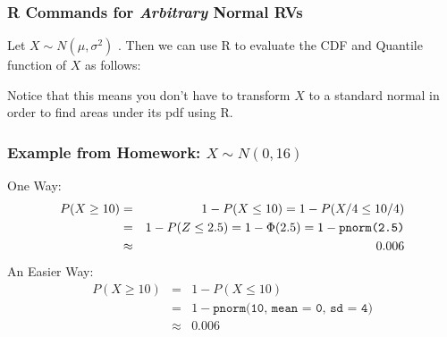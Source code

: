 \documentclass[handout]{beamer}
\begin{document}

\begin{frame}
  \frametitle{R Commands for \emph{Arbitrary} Normal RVs}
Let $X \sim N(\mu, \sigma^2)$ . Then we can use R to evaluate the CDF and Quantile function of $X$ as follows:
\vspace{1em}
\begin{table}
\centering
{}
\end{table}
\vspace{1em}
\alert{Notice that this means you don't have to transform $X$ to a standard normal in order to find areas under its pdf using R.}
\end{frame}
\begin{frame}
\frametitle{Example from Homework: $X \sim N(0,16)$}

One Way:
			\begin{eqnarray*}
				P(X \geq 10) &=&  1 - P(X \leq 10) = 1 - P(X /4\leq 10/4)\\
				&=& 1 - P(Z\leq 2.5) =   1 - \Phi(2.5) =  1 - \mbox{\texttt{pnorm(2.5)}}\\ 
				&\approx& 0.006
			\end{eqnarray*}
\pause
An Easier Way:
	\begin{eqnarray*}
	P(X \geq 10) &=& 1 - P(X \leq 10)\\ 
	&=&  1 - \texttt{pnorm(10, mean = 0, sd = 4)} \\ 
	&\approx& 0.006
	\end{eqnarray*}
\end{frame}
\end{document}
